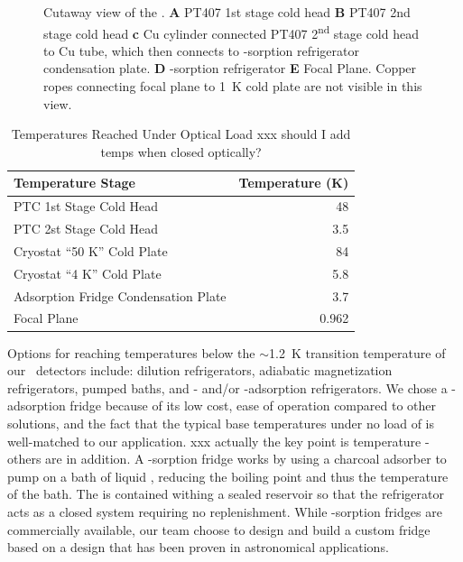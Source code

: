 \begin{figure}
\caption{Cutaway view of the \Imager. \textbf{A} PT407 1st stage cold head \textbf{B} PT407 2nd stage cold head \textbf{c} Cu cylinder connected PT407 2\textsuperscript{nd} stage cold head to Cu tube, which then connects to -sorption refrigerator condensation plate. \textbf{D} -sorption refrigerator \textbf{E} Focal Plane. Copper ropes connecting focal plane to 1~K cold plate are not visible in this view.}
\label{fig:cryo-cutaway}
\end{figure}

\begin{table}
\centering
\caption{Temperatures Reached Under Optical Load xxx should I add temps when closed optically?}
\label{tab:temp-optical-load}
\begin{tabular}{l r}
\toprule
Temperature Stage &  Temperature (K)\\
\midrule
PTC 1st Stage Cold Head 			& 48 \\
PTC 2st Stage Cold Head 			& 3.5 \\
Cryostat ``50 K'' Cold Plate 		& 84 \\
Cryostat ``4 K'' Cold Plate 			& 5.8 \\
Adsorption Fridge Condensation Plate 	& 3.7 \\
Focal Plane 						& 0.962 \\
\bottomrule
\end{tabular}
\end{table}

Options for reaching temperatures below the $\sim$1.2~K transition temperature of our \TES\ detectors include: dilution refrigerators, adiabatic magnetization refrigerators, pumped  baths, and - and/or -adsorption refrigerators.
We chose a -adsorption fridge because of its low cost, ease of operation compared to other solutions, and the fact that the typical base temperatures under no load of  is well-matched to our application. xxx actually the key point is temperature - others are in addition.
A  -sorption fridge works by using a charcoal adsorber to pump on a bath of liquid , reducing the  boiling point and thus the temperature of the bath.
The  is contained withing a sealed reservoir so that the refrigerator acts as a closed system requiring no  replenishment. 
While -sorption fridges are commercially available, our team choose to design and build a custom fridge based on a design that has been proven in astronomical applications\cite{devlin_high_2004}.

